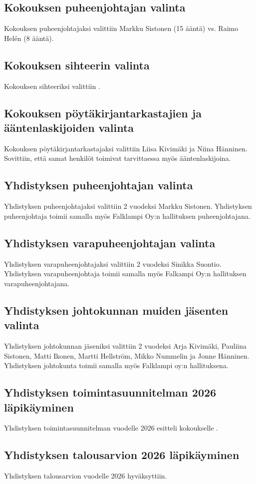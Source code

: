 \documentclass[a4paper,12pt]{article}
\begin{document}
\subsection{Kokouksen puheenjohtajan valinta}
Kokouksen puheenjohtajaksi valittiin Markku Sistonen (15 ääntä) vs. Raimo Helén (8 ääntä).
\subsection{Kokouksen sihteerin valinta}
Kokouksen sihteeriksi valittiin .
\subsection{Kokouksen pöytäkirjantarkastajien ja ääntenlaskijoiden valinta}
Kokouksen pöytäkirjantarkastajaksi valittiin Liisa Kivimäki ja Niina Hänninen. Sovittiin, että samat henkilöt toimivat tarvittaessa myös ääntenlaskijoina.
\subsection{Yhdistyksen puheenjohtajan valinta}
Yhdistyksen puheenjohtajaksi valittiin 2 vuodeksi Markku Sistonen. Yhdistyksen puheenjohtaja toimii samalla myös Falklampi Oy:n hallituksen puheenjohtajana.
\subsection{Yhdistyksen varapuheenjohtajan valinta}
Yhdistyksen varapuheenjohtajaksi valittiin 2 vuodeksi Sinikka Suontio. Yhdistyksen varapuheenjohtaja toimii samalla myös Falkampi Oy:n hallituksen varapuheenjohtajana.
\subsection{Yhdistyksen johtokunnan muiden jäsenten valinta}
Yhdistyksen johtokunnan jäseniksi valittiin 2 vuodeksi Arja Kivimäki, Pauliina Sistonen, Matti Ikonen, Martti Hellström, Mikko Nummelin ja Jonne Hänninen. Yhdistyksen johtokunta toimii samalla myös Falklampi oy:n hallituksena.
\subsection{Yhdistyksen toimintasuunnitelman 2026 läpikäyminen}
Yhdistyksen toimintasuunnitelman vuodelle 2026 esitteli kokoukselle .
\subsection{Yhdistyksen talousarvion 2026 läpikäyminen}
Yhdistyksen talousarvion vuodelle 2026 hyväksyttiin.
\end{document}
